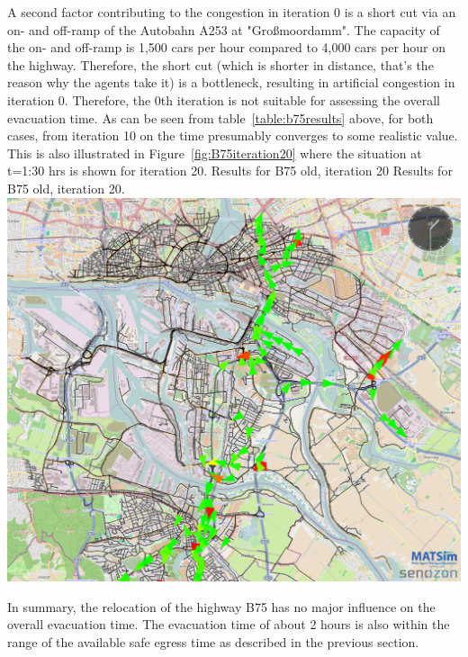 {}
%
A second factor contributing to the congestion in iteration 0 is a short cut via an on- and off-ramp of the Autobahn A253 at "Gro{\ss}moordamm". The capacity of the on- and off-ramp is 1,500 cars per hour compared to 4,000 cars per hour on the highway. Therefore, the short cut (which is shorter in distance, that's the reason why the agents take it) is a bottleneck, resulting in artificial congestion in iteration 0.
Therefore, the 0th iteration is not suitable for assessing the overall evacuation time. As can be seen from table~\ref{table:b75results} above, for both cases, from iteration 10 on the time presumably converges to some realistic value. This is also illustrated in Figure~\ref{fig:B75iteration20} where the situation at t=1:30 hrs is shown for iteration 20.
%
\createfigure%
{Results for B75 old, iteration 20}%
{Results for B75 old, iteration 20.}%
{\label{fig:B75iteration20}}%
{\includegraphics[width=0.7\linewidth]{using/figures/B75iteration20}}%
{}

In summary, the relocation of the highway B75 has no major influence on the overall evacuation time. The evacuation time of about 2 hours is also within the range of the available safe egress time as described in the previous section. 

